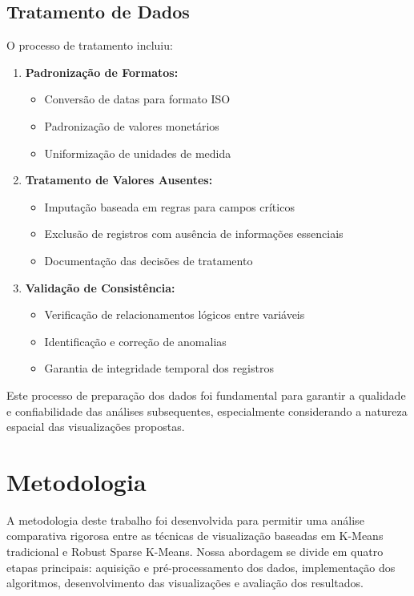 \documentclass[conference]{IEEEtran}
\begin{document}
\subsection{Tratamento de Dados}
O processo de tratamento incluiu:

\begin{enumerate}
\item \textbf{Padronização de Formatos:}
   \begin{itemize}
   \item Conversão de datas para formato ISO
   \item Padronização de valores monetários
   \item Uniformização de unidades de medida
   \end{itemize}

\item \textbf{Tratamento de Valores Ausentes:}
   \begin{itemize}
   \item Imputação baseada em regras para campos críticos
   \item Exclusão de registros com ausência de informações essenciais
   \item Documentação das decisões de tratamento
   \end{itemize}

\item \textbf{Validação de Consistência:}
   \begin{itemize}
   \item Verificação de relacionamentos lógicos entre variáveis
   \item Identificação e correção de anomalias
   \item Garantia de integridade temporal dos registros
   \end{itemize}
\end{enumerate}

Este processo de preparação dos dados foi fundamental para garantir a qualidade
e confiabilidade das análises subsequentes, especialmente considerando a natureza espacial das visualizações propostas.

\section{Metodologia}
A metodologia deste trabalho foi desenvolvida para permitir uma análise comparativa rigorosa entre as técnicas de visualização baseadas em K-Means tradicional
e Robust Sparse K-Means. Nossa abordagem se divide em quatro etapas principais: aquisição e pré-processamento dos dados, implementação dos algoritmos, desenvolvimento
das visualizações e avaliação dos resultados.
\end{document}
